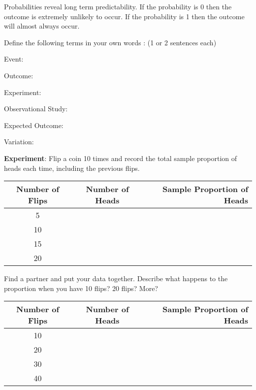 \begin{example}
  Probabilities reveal long term predictability. If the probability is
  0 then the outcome is extremely unlikely to occur. If the
  probability is 1 then the outcome will almost always occur.
\end{example}
\begin{problem}

\item Define the following terms in your own words : (1 or 2 sentences
  each)

  \begin{subproblem}
    \item Event:
      \vfill
    \item Outcome:
      \vfill
    \item Experiment:
      \vfill
    \item Observational Study:
      \vfill
    \item Expected Outcome:
      \vfill
    \item Variation:
      \vfill
  \end{subproblem}

\item \textbf{Experiment}: Flip a coin 10 times and record the total
  sample proportion of heads each time, including the previous flips.

  \begin{tabular}{| c | c | r |}
    \hline 
    Number of Flips & Number of Heads & Sample Proportion of Heads \\ \hline 
    5 &  & \\  [12pt] \hline 
    10 &  & \\  [12pt] \hline 
    15 & & \\  [12pt]  \hline 
    20 & & \\ [12pt]  \hline 
  \end{tabular}  

  \clearpage

\item Find a partner and put your data together. Describe what happens
  to the proportion when you have 10 flips? 20 flips? More?

  \begin{tabular}{| c | c | r |}
    \hline 
    Number of Flips & Number of Heads & Sample Proportion of Heads \\ \hline 
    10 &  & \\  [12pt] \hline 
    20 &  & \\  [12pt] \hline 
    30 & & \\  [12pt]  \hline 
    40 & & \\ [12pt]  \hline 
  \end{tabular}  




\end{problem}
